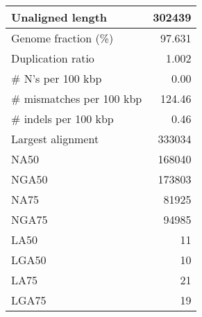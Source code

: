 \documentclass[12pt,a4paper]{article}
\begin{document}
\begin{table}[ht]
\begin{center}
\begin{tabular}{|l*{1}{|r}|}
Unaligned length & 302439 \\ \hline
Genome fraction (\%) & 97.631 \\ \hline
Duplication ratio & 1.002 \\ \hline
\# N's per 100 kbp & 0.00 \\ \hline
\# mismatches per 100 kbp & 124.46 \\ \hline
\# indels per 100 kbp & 0.46 \\ \hline
Largest alignment & 333034 \\ \hline
NA50 & 168040 \\ \hline
NGA50 & 173803 \\ \hline
NA75 & 81925 \\ \hline
NGA75 & 94985 \\ \hline
LA50 & 11 \\ \hline
LGA50 & 10 \\ \hline
LA75 & 21 \\ \hline
LGA75 & 19 \\ \hline
\end{tabular}
\end{center}
\end{table}
\end{document}
